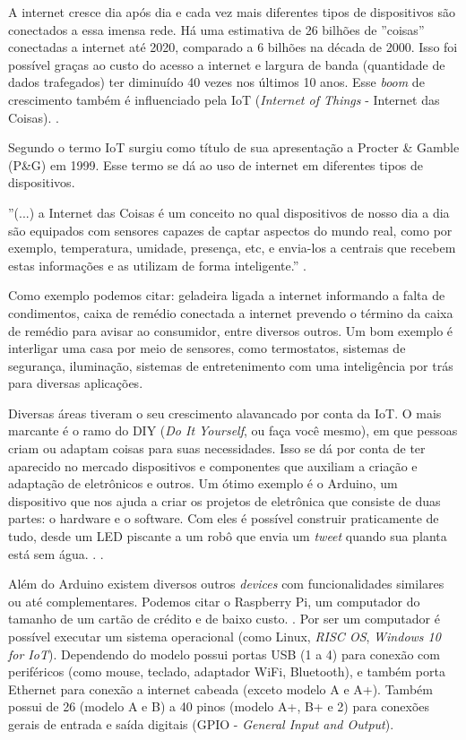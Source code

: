\documentclass[
	12pt,				%
	openright,			%
	oneside,			%
	a4paper,			%
	chapter=TITLE,		%
	english,			%
	french,				%
	spanish,			%
	brazil				%
	]{abntex2}
\begin{document}
{A internet cresce dia após dia e cada vez mais diferentes tipos de dispositivos são conectados a essa imensa rede. Há uma estimativa de 26 bilhões de ''coisas'' conectadas a internet até 2020, comparado a 6 bilhões na década de 2000. Isso foi possível graças ao custo do acesso a internet e largura de banda (quantidade de dados trafegados) ter diminuído 40 vezes nos últimos 10 anos. Esse \textit{boom} de crescimento também é influenciado pela IoT (\textit{Internet of Things} - Internet das Coisas). \cite{goldmansachs-iot}. 

Segundo  o termo IoT surgiu como título de sua apresentação a Procter \& Gamble (P\&G) em 1999. Esse termo se dá ao uso de internet em diferentes tipos de dispositivos. 

\begin{citacao}
''(...) a Internet das Coisas é um conceito no qual dispositivos de nosso dia a dia são equipados com sensores capazes de captar aspectos do mundo real, como por exemplo, temperatura, umidade, presença, etc, e envia-los a centrais que recebem estas informações e as utilizam de forma inteligente.'' \cite{nascimento-iot}.
\end{citacao}

Como exemplo podemos citar: geladeira ligada a internet informando a falta de condimentos, caixa de remédio conectada a internet prevendo o término da caixa de remédio para avisar ao consumidor, entre diversos outros. Um bom exemplo é interligar uma casa por meio de sensores, como termostatos, sistemas de segurança, iluminação, sistemas de entretenimento com uma inteligência por trás para diversas aplicações. \cite{goldmansachs-iot}

Diversas áreas tiveram o seu crescimento alavancado por conta da IoT. O mais marcante é o ramo do DIY (\textit{Do It Yourself}, ou faça você mesmo), em que pessoas criam ou adaptam coisas para suas necessidades. Isso se dá por conta de ter aparecido no mercado dispositivos e componentes que auxiliam a criação e adaptação de eletrônicos e outros. Um ótimo exemplo é o Arduino, um dispositivo que nos ajuda a criar os projetos de eletrônica que consiste de duas partes: o hardware e o software. Com eles é possível construir praticamente de tudo, desde um LED piscante a um robô que envia um \textit{tweet} quando sua planta está sem água. \cite{ben-arduino}. \cite{sorrel-arduino}.

Além do Arduino existem diversos outros \textit{devices} com funcionalidades similares ou até complementares. Podemos citar o Raspberry Pi, um computador do tamanho de um cartão de crédito e de baixo custo. \cite{raspberrypi-rpi}. Por ser um computador é possível executar um sistema operacional (como Linux, \textit{RISC OS}, \textit{Windows 10 for IoT}). Dependendo do modelo possui portas USB (1 a 4) para conexão com periféricos (como mouse, teclado, adaptador WiFi, Bluetooth), e também porta Ethernet para conexão a internet cabeada (exceto modelo A e A+). Também possui de 26 (modelo A e B) a 40 pinos (modelo A+, B+ e 2) para conexões gerais de entrada e saída digitais (GPIO - \textit{General Input and Output}). 

}
\end{document}
